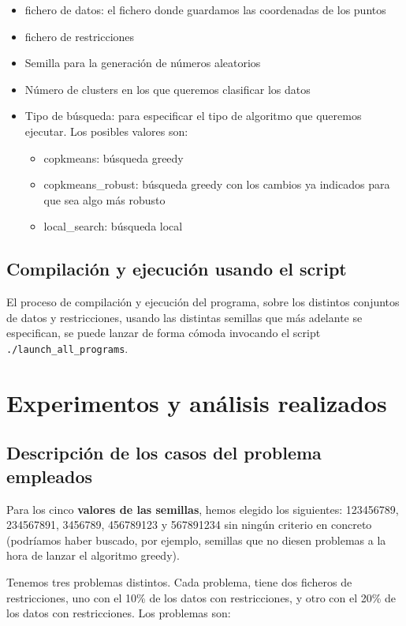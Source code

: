 \documentclass[11pt]{article}
\begin{document}
\begin{itemize}
    \item fichero de datos: el fichero donde guardamos las coordenadas de los puntos
    \item fichero de restricciones
    \item Semilla para la generación de números aleatorios
    \item Número de clusters en los que queremos clasificar los datos
    \item Tipo de búsqueda: para especificar el tipo de algoritmo que queremos ejecutar. Los posibles valores son:
    \begin{itemize}
        \item copkmeans: búsqueda greedy
        \item copkmeans\_robust: búsqueda greedy con los cambios ya indicados para que sea algo más robusto
        \item local\_search: búsqueda local
    \end{itemize}
\end{itemize}

\subsection{Compilación y ejecución usando el script}

El proceso de compilación y ejecución del programa, sobre los distintos conjuntos de datos y restricciones, usando las distintas semillas que más adelante se especifican, se puede lanzar de forma cómoda invocando el script \lstinline{./launch_all_programs}.

\pagebreak

\section{Experimentos y análisis realizados}

\subsection{Descripción de los casos del problema empleados}

Para los cinco \textbf{valores de las semillas}, hemos elegido los siguientes: 123456789, 234567891, 3456789, 456789123 y 567891234 sin ningún criterio en concreto (podríamos haber buscado, por ejemplo, semillas que no diesen problemas a la hora de lanzar el algoritmo greedy).

Tenemos tres problemas distintos. Cada problema, tiene dos ficheros de restricciones, uno con el 10\% de los datos con restricciones, y otro con el 20\% de los datos con restricciones. Los problemas son:
\end{document}

